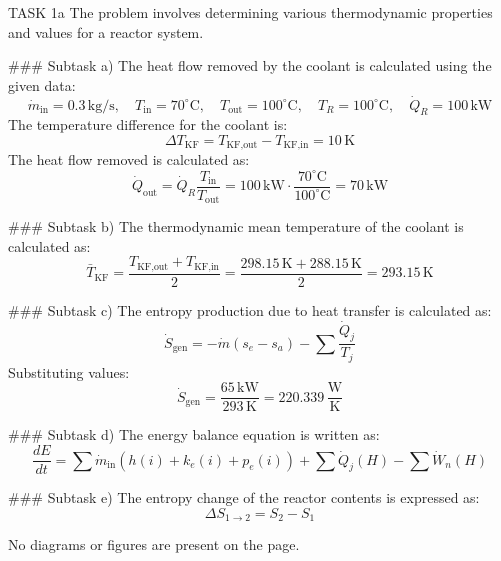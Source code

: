 TASK 1a  
The problem involves determining various thermodynamic properties and values for a reactor system.  

### Subtask a)  
The heat flow removed by the coolant is calculated using the given data:  
\[
\dot{m}_{\text{in}} = 0.3 \, \text{kg/s}, \quad T_{\text{in}} = 70^\circ\text{C}, \quad T_{\text{out}} = 100^\circ\text{C}, \quad T_R = 100^\circ\text{C}, \quad \dot{Q}_R = 100 \, \text{kW}
\]  
The temperature difference for the coolant is:  
\[
\Delta T_{\text{KF}} = T_{\text{KF,out}} - T_{\text{KF,in}} = 10 \, \text{K}
\]  
The heat flow removed is calculated as:  
\[
\dot{Q}_{\text{out}} = \dot{Q}_R \frac{T_{\text{in}}}{T_{\text{out}}} = 100 \, \text{kW} \cdot \frac{70^\circ\text{C}}{100^\circ\text{C}} = 70 \, \text{kW}
\]  

### Subtask b)  
The thermodynamic mean temperature of the coolant is calculated as:  
\[
\bar{T}_{\text{KF}} = \frac{T_{\text{KF,out}} + T_{\text{KF,in}}}{2} = \frac{298.15 \, \text{K} + 288.15 \, \text{K}}{2} = 293.15 \, \text{K}
\]  

### Subtask c)  
The entropy production due to heat transfer is calculated as:  
\[
\dot{S}_{\text{gen}} = -\dot{m} (s_e - s_a) - \sum \frac{\dot{Q}_j}{T_j}
\]  
Substituting values:  
\[
\dot{S}_{\text{gen}} = \frac{65 \, \text{kW}}{293 \, \text{K}} = 220.339 \, \frac{\text{W}}{\text{K}}
\]  

### Subtask d)  
The energy balance equation is written as:  
\[
\frac{dE}{dt} = \sum \dot{m}_{\text{in}}(h(i) + k_e(i) + p_e(i)) + \sum \dot{Q}_j(H) - \sum \dot{W}_n(H)
\]  

### Subtask e)  
The entropy change of the reactor contents is expressed as:  
\[
\Delta S_{1 \to 2} = S_2 - S_1
\]  

No diagrams or figures are present on the page.